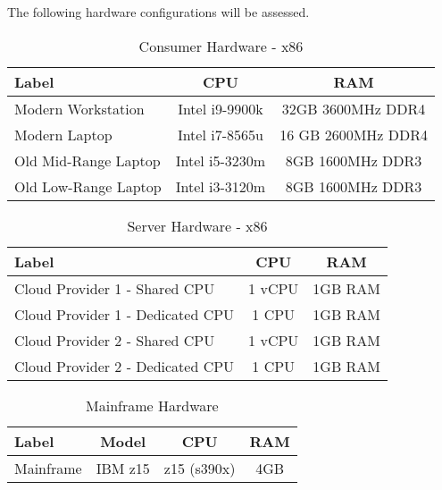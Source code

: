 The following hardware configurations will be assessed.

\begin{table}[H]
    \centering
    \begin{tabular}{l|c|c}
        Label & CPU & RAM\\
        \hline
        Modern Workstation & Intel i9-9900k & 32GB 3600MHz DDR4\\
        Modern Laptop & Intel i7-8565u & 16 GB 2600MHz DDR4\\
        Old Mid-Range Laptop & Intel i5-3230m & 8GB 1600MHz DDR3\\
        Old Low-Range Laptop & Intel i3-3120m & 8GB 1600MHz DDR3
    \end{tabular}
    \caption{Consumer Hardware - x86}
    \label{table:method:consumer-hardware}
\end{table}

\begin{table}[H]
    \centering
    \begin{tabular}{l|c|c}
        Label & CPU & RAM\\
        \hline
        Cloud Provider 1 - Shared CPU\footnotemark & 1 vCPU & 1GB RAM \\
        Cloud Provider 1 - Dedicated CPU\footnotemark & 1 CPU & 1GB RAM \\
        Cloud Provider 2 - Shared CPU\footnotemark & 1 vCPU & 1GB RAM \\
        Cloud Provider 2 - Dedicated CPU\footnotemark & 1 CPU & 1GB RAM \\
    \end{tabular}
    \caption{Server Hardware - x86}
    \label{table:method:server-hardware}
\end{table}
\addtocounter{footnote}{-4}
\addtocounter{footnote}{1}
\addtocounter{footnote}{1}
\addtocounter{footnote}{1}
\addtocounter{footnote}{1}

\begin{table}[H]
    \centering
    \begin{tabular}{l|c|c|c}
        Label & Model & CPU & RAM\\
        \hline
        Mainframe & IBM z15 & z15 (s390x) & 4GB\\
    \end{tabular}
    \caption{Mainframe Hardware}
    \label{table:method:mainframe-hardware}
\end{table}

